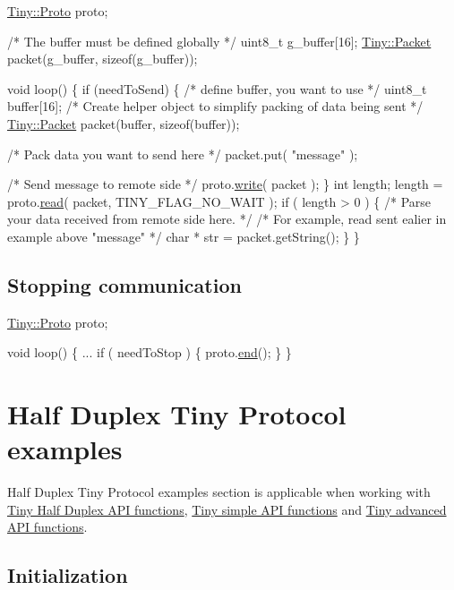 \begin{DoxyCode}
\hyperlink{classTiny_1_1Proto}{Tiny::Proto} proto;

\textcolor{comment}{/* The buffer must be defined globally */}
uint8\_t g\_buffer[16];
\hyperlink{classTiny_1_1Packet}{Tiny::Packet} packet(g\_buffer, \textcolor{keyword}{sizeof}(g\_buffer));

\textcolor{keywordtype}{void} loop()
\{
    \textcolor{keywordflow}{if} (needToSend)
    \{
        \textcolor{comment}{/* define buffer, you want to use */}
        uint8\_t buffer[16];
        \textcolor{comment}{/* Create helper object to simplify packing of data being sent */}
        \hyperlink{classTiny_1_1Packet}{Tiny::Packet} packet(buffer, \textcolor{keyword}{sizeof}(buffer));

        \textcolor{comment}{/* Pack data you want to send here */}
        packet.put( \textcolor{stringliteral}{"message"} );

        \textcolor{comment}{/* Send message to remote side */}
        proto.\hyperlink{classTiny_1_1Proto_a46fbc8b8681431b9b0a9a4b953a8dc33}{write}( packet );
    \}
    \textcolor{keywordtype}{int} length;
    length = proto.\hyperlink{classTiny_1_1Proto_acc00ac10509eaa11a83b0b88a2278b3e}{read}( packet, TINY\_FLAG\_NO\_WAIT );
    \textcolor{keywordflow}{if} ( length > 0 )
    \{
        \textcolor{comment}{/* Parse your data received from remote side here. */}
        \textcolor{comment}{/* For example, read sent ealier in example above "message" */}
        \textcolor{keywordtype}{char} * str = packet.getString();
    \}
\}
\end{DoxyCode}
\hypertarget{arduino_arduino_tiny_close}{}\subsection{Stopping communication}\label{arduino_arduino_tiny_close}

\begin{DoxyCode}
\hyperlink{classTiny_1_1Proto}{Tiny::Proto} proto;

\textcolor{keywordtype}{void} loop()
\{
    ...
    \textcolor{keywordflow}{if} ( needToStop )
    \{
        proto.\hyperlink{classTiny_1_1Proto_ae9f52fa1c4f18981672ad7af12633d4e}{end}();
    \}
\}
\end{DoxyCode}
\hypertarget{arduino_arduino_tiny_hd}{}\section{Half Duplex Tiny Protocol examples}\label{arduino_arduino_tiny_hd}
Half Duplex Tiny Protocol examples section is applicable when working with \hyperlink{group__HALF__DUPLEX__API}{Tiny Half Duplex A\+P\+I functions}, \hyperlink{group__SIMPLE__API}{Tiny simple A\+P\+I functions} and \hyperlink{group__ADVANCED__API}{Tiny advanced A\+P\+I functions}.\hypertarget{arduino_arduino_tiny_hd_init}{}\subsection{Initialization}\label{arduino_arduino_tiny_hd_init}

